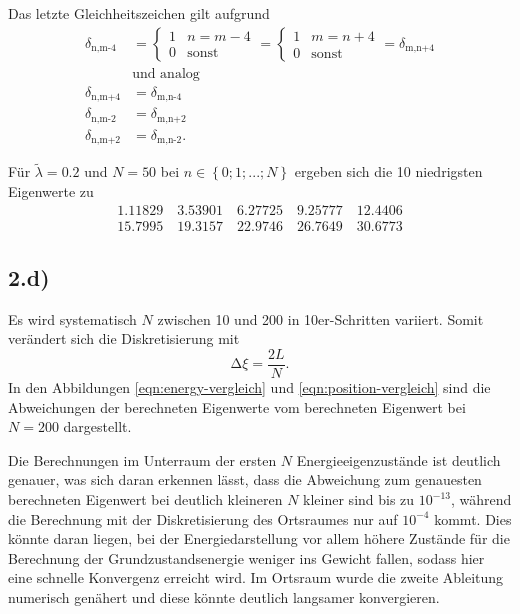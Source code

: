 Das letzte Gleichheitszeichen gilt aufgrund
\begin{align*}
  \delta_\text{n,m-4} &=
  \begin{cases}
    1 & n=m-4 \\
    0 & \text{sonst}
  \end{cases}
  =
  \begin{cases}
    1 & m=n+4 \\
    0 & \text{sonst}
  \end{cases}
  = \delta_\text{m,n+4} \\
  &\text{und analog} \\
  \delta_\text{n,m+4} &= \delta_\text{m,n-4} \\
  \delta_\text{n,m-2} &= \delta_\text{m,n+2} \\
  \delta_\text{n,m+2} &= \delta_\text{m,n-2}
  .
\end{align*}

Für $\tilde{\lambda} = \num{0.2}$ und $N = \num{50}$ bei
$n \in \left\{0;1;...;N\right\}$ ergeben sich die 10 niedrigsten Eigenwerte zu
\begin{gather*}
  \num{1.11829} \quad \num{3.53901} \quad \num{6.27725} \quad \num{9.25777} \quad \num{12.4406} \\
  \num{15.7995} \quad \num{19.3157} \quad \num{22.9746} \quad \num{26.7649} \quad \num{30.6773}
\end{gather*}

\subsection*{2.d)}

Es wird systematisch $N$ zwischen \num{10} und \num{200} in \num{10}er-Schritten
variiert. Somit verändert sich die Diskretisierung mit
\begin{equation*}
  \increment \xi = \frac{2 L}{N}.
\end{equation*}
In den Abbildungen \eqref{eqn:energy-vergleich} und \eqref{eqn:position-vergleich}
sind die Abweichungen der berechneten Eigenwerte vom berechneten Eigenwert bei
$N = \num{200}$ dargestellt.

Die Berechnungen im Unterraum der ersten $N$ Energieeigenzustände ist deutlich genauer,
was sich daran erkennen lässt, dass die Abweichung zum genauesten berechneten
Eigenwert bei deutlich kleineren $N$ kleiner sind bis zu $10^{-13}$, während
die Berechnung mit der Diskretisierung des Ortsraumes nur auf $10^{-4}$ kommt.
Dies könnte daran liegen, bei der Energiedarstellung vor allem höhere Zustände für
die Berechnung der Grundzustandsenergie weniger ins Gewicht fallen, sodass hier
eine schnelle Konvergenz erreicht wird.
Im Ortsraum wurde die zweite Ableitung numerisch genähert und diese könnte deutlich
langsamer konvergieren.

